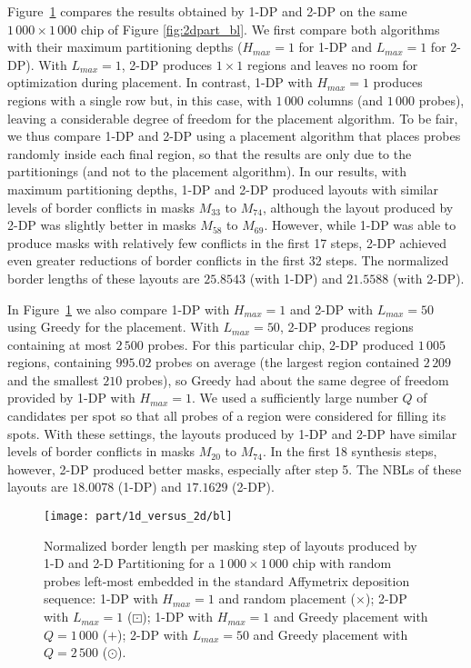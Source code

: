 Figure~\ref{fig:1dp_versus_2dp} compares the results obtained by 1-DP and 2-DP
on the same $1\,000\times 1\,000$ chip of Figure \ref{fig:2dpart_bl}. We first
compare both algorithms with their maximum partitioning depths ($H_{max}=1$ for
1-DP and $L_{max}=1$ for 2-DP). With $L_{max}=1$, 2-DP produces $1\times 1$
regions and leaves no room for optimization during placement. In contrast, 1-DP
with $H_{max}=1$ produces regions with a single row but, in this case, with
$1\,000$ columns (and $1\,000$ probes), leaving a considerable degree of
freedom for the placement algorithm. To be fair, we thus compare 1-DP and
2-DP using a placement algorithm that places probes randomly inside each final
region, so that the results are only due to the partitionings (and not to the
placement algorithm). In our results, with maximum partitioning depths, 1-DP and
2-DP produced layouts with similar levels of border conflicts in masks
$M_{33}$ to $M_{74}$, although the layout produced by 2-DP was slightly better
in masks $M_{58}$ to $M_{69}$. However, while 1-DP was able to produce masks
with relatively few conflicts in the first 17 steps, 2-DP achieved even greater
reductions of border conflicts in the first 32 steps. The normalized border
lengths of these layouts are $25.8543$ (with 1-DP) and $21.5588$ (with 2-DP).

In Figure~\ref{fig:1dp_versus_2dp} we also compare 1-DP with $H_{max}=1$ and
2-DP with $L_{max}=50$ using Greedy for the placement. With $L_{max}=50$, 2-DP
produces regions containing at most $2\,500$ probes. For this particular chip,
2-DP produced $1\,005$ regions, containing $995.02$ probes on average (the
largest region contained $2\,209$ and the smallest $210$ probes), so Greedy had
about the same degree of freedom provided by 1-DP with $H_{max}=1$. We used a
sufficiently large number $Q$ of candidates per spot so that all probes of a
region were considered for filling its spots. With these settings, the layouts
produced by 1-DP and 2-DP have similar levels of border conflicts in masks
$M_{20}$ to $M_{74}$. In the first 18 synthesis steps, however, 2-DP produced
better masks, especially after step 5. The NBLs of these layouts are $18.0078$
(1-DP) and $17.1629$ (2-DP).

\begin{figure}[t]\centering
\texttt{[image: part/1d\_versus\_2d/bl]}
\caption{\label{fig:1dp_versus_2dp}
  Normalized border length per masking step of layouts produced by 1-D and 2-D
  Partitioning for a $1\,000\times 1\,000$ chip with random probes left-most
  embedded in the standard Affymetrix deposition sequence: 1-DP with $H_{max}=1$
  and random placement ({\scriptsize $\times$}); 2-DP with $L_{max}=1$
  ({\tiny $\boxdot$}); 1-DP with $H_{max}=1$ and Greedy placement with
  $Q=1\,000$ ({\tiny $+$}); 2-DP with $L_{max}=50$ and Greedy placement with
  $Q=2\,500$ ({\tiny $\odot$}).}
\end{figure}

